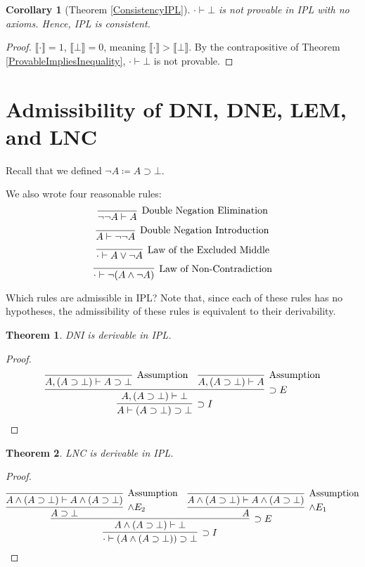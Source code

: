 \documentclass[12pt]{article}
\newtheorem{theorem}{Theorem}[section]
\newtheorem{corollary}{Corollary}[theorem]
\newcommand{\db}[1]{\llbracket #1 \rrbracket}
\begin{document}
\begin{corollary}[Theorem \ref{ConsistencyIPL}]
$\cdot \vdash \bot$ is not provable in IPL with no axioms. Hence, IPL is consistent.
\end{corollary}
\begin{proof}
$\db{\cdot} = 1$, $\db{\bot} = 0$, meaning $\db{\cdot} > \db{\bot}$. By the contrapositive of Theorem \ref{ProvableImpliesInequality}, $\cdot \vdash \bot$ is not provable. 
\end{proof}

\section{Admissibility of DNI, DNE, LEM, and LNC}
Recall that we defined $\neg A \coloneqq A \supset \bot$.

We also wrote four reasonable rules:
\[
\infer[\text{Double Negation Elimination}]{\neg\neg A \vdash A}{}
\]
\[
\infer[\text{Double Negation Introduction}]{A \vdash \neg\neg A}{}
\]
\[
\infer[\text{Law of the Excluded Middle}]{\cdot \vdash A \lor \neg A}{}
\]
\[
\infer[\text{Law of Non-Contradiction}]{\cdot \vdash \neg(A \land \neg A)}{}
\]

Which rules are admissible in IPL? Note that, since each of these rules has no hypotheses, the admissibility of these rules is equivalent to their derivability.

\begin{theorem}
DNI is derivable in IPL.
\end{theorem}
\begin{proof}
\[
\infer[\supset I]
{A \vdash (A \supset \bot) \supset \bot}
{
    \infer[\supset E]
    {A, (A \supset \bot) \vdash \bot}
    {
    \infer[\text{Assumption}]{A, (A \supset \bot) \vdash A \supset \bot}{} &
    \infer[\text{Assumption}]{A, (A \supset \bot) \vdash A}{}
    }
}
\]
\end{proof}

\begin{theorem}
LNC is derivable in IPL.
\end{theorem}
\begin{proof}
\[
\infer[\supset I]
{\cdot \vdash (A \land (A \supset \bot)) \supset \bot}
{
    \infer[\supset E]
    {A \land (A \supset \bot) \vdash \bot}
    {
        \infer[\land E_2]{A \supset \bot}{
            \infer[\text{Assumption}]{A \land (A \supset \bot) \vdash A \land (A \supset \bot)}{}
        } &
        \infer[\land E_1]{A}{
            \infer[\text{Assumption}]{A \land (A \supset \bot) \vdash A \land (A \supset \bot)}{}
        }
    }
}
\]
\end{proof}
\end{document}
